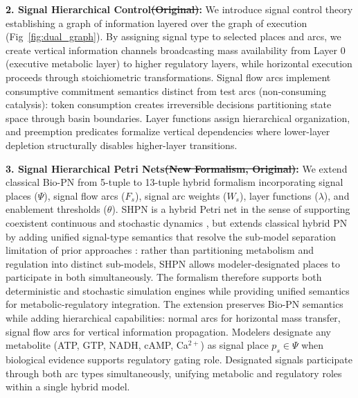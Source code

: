 \documentclass[10pt,letterpaper]{article}
\providecommand{\DIFdeltex}[1]{{\protect\color{red}\sout{#1}}}                      %
\providecommand{\DIFdelbegin}{} %
\providecommand{\DIFdelend}{} %
\providecommand{\DIFdel}[1]{\texorpdfstring{\DIFdeltex{#1}}{}} %
\newcommand{\DIFscaledelfig}{0.5}
\newlength{\DIFdelgraphicswidth} %
\newlength{\DIFdelgraphicsheight} %
\newcommand{\DIFdelincludegraphics}[2][]{%
\sbox{\DIFdelgraphicsbox}{\DIFOincludegraphics[#1]{#2}}%
\settoboxwidth{\DIFdelgraphicswidth}{\DIFdelgraphicsbox} %
\settoboxtotalheight{\DIFdelgraphicsheight}{\DIFdelgraphicsbox} %
\scalebox{\DIFscaledelfig}{%
\parbox[b]{\DIFdelgraphicswidth}{\usebox{\DIFdelgraphicsbox}\\[-\baselineskip] \rule{\DIFdelgraphicswidth}{0em}}\llap{\resizebox{\DIFdelgraphicswidth}{\DIFdelgraphicsheight}{%
\setlength{\unitlength}{\DIFdelgraphicswidth}%
\begin{picture}(1,1)%
\thicklines\linethickness{2pt} %
{\color[rgb]{1,0,0}\put(0,0){\framebox(1,1){}}}%
{\color[rgb]{1,0,0}\put(0,0){\line( 1,1){1}}}%
{\color[rgb]{1,0,0}\put(0,1){\line(1,-1){1}}}%
\end{picture}%
}\hspace*{3pt}}} %
} %
\DeclareRobustCommand{\DIFdelbegin}{\DIFOdelbegin \let\includegraphics\DIFdelincludegraphics} %
\DeclareRobustCommand{\DIFdelend}{\DIFOaddend \let\includegraphics\DIFOincludegraphics} %
\begin{document}
\textbf{2. Signal Hierarchical Control\DIFdelbegin \DIFdel{(Original)}\DIFdelend :} We introduce signal control theory establishing a graph of information layered over the graph of execution (Fig~\ref{fig:dual_graph}). By assigning signal type to selected places and arcs, we create vertical information channels broadcasting mass availability from Layer 0 (executive metabolic layer) to higher regulatory layers, while horizontal execution proceeds through stoichiometric transformations. Signal flow arcs implement consumptive commitment semantics distinct from test arcs (non-consuming catalysis): token consumption creates irreversible decisions partitioning state space through basin boundaries. Layer functions assign hierarchical organization, and preemption predicates formalize vertical dependencies where lower-layer depletion structurally disables higher-layer transitions.

\textbf{3. Signal Hierarchical Petri Nets\DIFdelbegin \DIFdel{(New Formalism, Original)}\DIFdelend :} We extend classical Bio-PN \cite{reisig1985,koch2011} from 5-tuple to 13-tuple hybrid formalism incorporating signal places ($\Psi$), signal flow arcs ($F_s$), signal arc weights ($W_s$), layer functions ($\lambda$), and enablement thresholds ($\theta$). SHPN is a hybrid Petri net in the sense of supporting coexistent continuous and stochastic dynamics \cite{alla1998,matsuno2003}, but extends classical hybrid PN by adding unified signal-type semantics that resolve the sub-model separation limitation of prior approaches \cite{liu2013}: rather than partitioning metabolism and regulation into distinct sub-models, SHPN allows modeler-designated places to participate in both simultaneously. The formalism therefore supports both deterministic and stochastic simulation engines \cite{goss1998} while providing unified semantics for metabolic-regulatory integration. The extension preserves Bio-PN semantics while adding hierarchical capabilities: normal arcs for horizontal mass transfer, signal flow arcs for vertical information propagation. Modelers designate any metabolite (ATP, GTP, NADH, cAMP, Ca$^{2+}$) as signal place $p_s \in \Psi$ when biological evidence supports regulatory gating role. Designated signals participate through both arc types simultaneously, unifying metabolic and regulatory roles within a single hybrid model.
\end{document}

